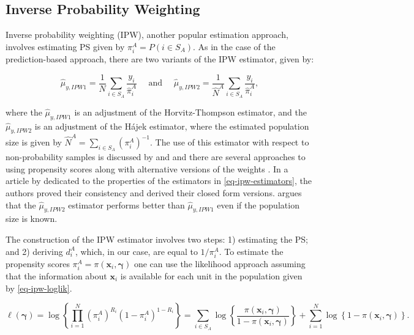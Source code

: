 \documentclass[
]{jss}
\begin{document}
\subsection{Inverse Probability Weighting}\label{sec-ipw}

Inverse probability weighting (IPW), another popular estimation
approach, involves estimating PS given by
\(\pi_i^A=P\left(i \in S_A \right)\). As in the case of the
prediction-based approach, there are two variants of the IPW estimator,
given by:

\begin{equation}
  \hat{\mu}_{y,IPW1}=\frac{1}{N} \sum_{i \in S_A} \frac{y_i}{\hat{\pi}_i^A} \quad \text { and } \quad 
  \hat{\mu}_{y,IPW2}=\frac{1}{\hat{N}^A} \sum_{i \in S_A} \frac{y_i}{\hat{\pi}_i^A},
\label{eq-ipw-estimators}
\end{equation}

where the \(\hat{\mu}_{y,IPW1}\) is an adjustment of the
Horvitz-Thompson estimator, and the \(\hat{\mu}_{y,IPW2}\) is an
adjustment of the Hájek estimator, where the estimated population size
is given by \(\hat{N}^A = \sum_{i \in S_A} (\pi_i^A)^{-1}\). The use of
this estimator with respect to non-probability samples is discussed by
\citet{lee2006propensity} and
\citet[chapter 13]{biffignandi2021handbook} and there are several
approaches to using propensity scores along with alternative versions of
the weights \citep[cf.][section 3]{elliott_inference_2017}. In a article
by \citet{chen2020doubly} dedicated to the properties of the estimators
in \eqref{eq-ipw-estimators}, the authors proved their consistency and
derived their closed form versions.
\citet[section 4.2]{wu2022statistical} argues that the
\(\hat{\mu}_{y,IPW2}\) estimator performs better than
\(\hat{\mu}_{y,IPW1}\) even if the population size is known.

The construction of the IPW estimator involves two steps: 1) estimating
the PS; and 2) deriving \(d_i^A\), which, in our case, are equal to
\(1/\pi_i^A\). To estimate the propensity scores
\(\pi_i^A=\pi(\boldsymbol{x}_i, \boldsymbol{\gamma})\) one can use the
likelihood approach assuming that the information about
\(\boldsymbol{x}_i\) is available for each unit in the population given
by \eqref{eq-ipw-loglik}.

\begin{equation}
\ell(\boldsymbol{\gamma}) = \log\left\{\prod_{i=1}^N \left(\pi_i^A\right)^{R_i}\left(1-\pi_i^A\right)^{1-R_i}\right\} =
\sum_{i \in S_{A}} \log \left\{\frac{\pi\left(\boldsymbol{x}_i, \boldsymbol{\gamma}\right)}{1-\pi\left(\boldsymbol{x}_i, \boldsymbol{\gamma}\right)}\right\}+\sum_{i=1}^N \log \left\{1-\pi\left(\boldsymbol{x}_i, \boldsymbol{\gamma}\right)\right\}.
\label{eq-ipw-loglik}
\end{equation}
\end{document}
